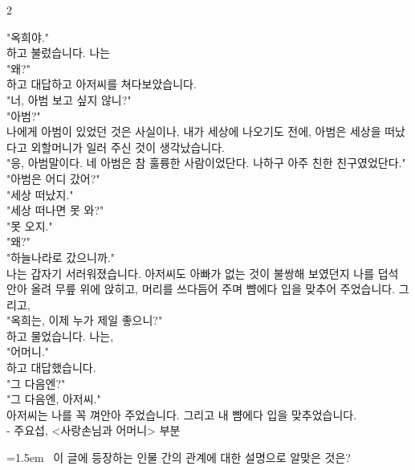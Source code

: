\documentclass[11pt, a4paper]{article}
\begin{document}
\begin{multicols}{2}
\vspace{1mm}
\vspace{0.5mm}

\begin{passagebox}
\noindent{}"옥희야." \\
하고 불렀습니다. 나는 \\
"왜?" \\
하고 대답하고 아저씨를 쳐다보았습니다. \\
"너, 아범 보고 싶지 않니?" \\
"아범?" \\
나에게 아범이 있었던 것은 사실이나, 내가 세상에 나오기도 전에, 아범은 세상을 떠났다고 외할머니가 일러 주신 것이 생각났습니다. \\
"응, 아범말이다. 네 아범은 참 훌륭한 사람이었단다. 나하구 아주 친한 친구였었단다." \\
"아범은 어디 갔어?" \\
"세상 떠났지." \\
"세상 떠나면 못 와?" \\
"못 오지." \\
"왜?" \\
"하늘나라로 갔으니까." \\
나는 갑자기 서러워졌습니다. 아저씨도 아빠가 없는 것이 불쌍해 보였던지 나를 덥석 안아 올려 무릎 위에 앉히고, 머리를 쓰다듬어 주며 뺨에다 입을 맞추어 주었습니다. 그리고, \\
"옥희는, 이제 누가 제일 좋으니?" \\
하고 물었습니다. 나는, \\
"어머니." \\
하고 대답했습니다. \\
"그 다음엔?" \\
"그 다음엔, 아저씨." \\
아저씨는 나를 꼭 껴안아 주었습니다. 그리고 내 뺨에다 입을 맞추었습니다.
\\[0.5em]
- 주요섭, <사랑손님과 어머니> 부분
\end{passagebox}
\vspace{1mm}

\noindent\begin{minipage}{\columnwidth}
\vspace{2mm}
{\hangindent=1.5em  ~이 글에 등장하는 인물 간의 관계에 대한 설명으로 알맞은 것은?\par}


\end{minipage}
\end{multicols}
\end{document}
